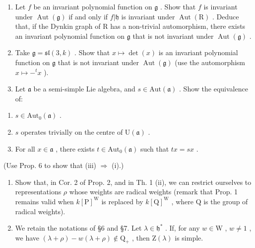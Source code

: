 
\begin{enumerate}
\def\labelenumi{\arabic{enumi})}
\item
  Let \(f\) be an invariant polynomial function on \(\mathfrak{g}\) . Show that \(f\) is invariant under \(\operatorname{Aut}(\mathfrak{g})\) if and only if \(f|\mathfrak{h}\) is invariant under \(\operatorname{Aut}(\mathrm{R})\) . Deduce that, if the Dynkin graph of \(\mathrm{R}\) has a non-trivial automorphism, there exists an invariant polynomial function on \(\mathfrak{g}\) that is not invariant under \(\operatorname{Aut}(\mathfrak{g})\) .
\item
  Take \(\mathfrak{g} = \mathfrak{sl}(3,k)\) . Show that \(x\mapsto \det (x)\) is an invariant polynomial function on \(\mathfrak{g}\) that is not invariant under \(\operatorname {Aut}(\mathfrak{g})\) (use the automorphism \(x\mapsto -^t x\) ).
\item
  Let \(\mathfrak{a}\) be a semi-simple Lie algebra, and \(s\in \mathrm{Aut}(\mathfrak{a})\) . Show the equivalence of:
\end{enumerate}

\begin{enumerate}
\def\labelenumi{(\roman{enumi})}
\item
  \(s \in \text{Aut}_{0}(\mathfrak{a})\) .
\item
  \(s\) operates trivially on the centre of \(\mathrm{U}(\mathfrak{a})\) .
\item
  For all \(x \in \mathfrak{a}\) , there exists \(t \in \mathrm{Aut}_0(\mathfrak{a})\) such that \(tx = sx\) .
\end{enumerate}

(Use Prop. 6 to show that (iii) \(\Longrightarrow\) (i).)

\begin{enumerate}
\def\labelenumi{\arabic{enumi})}
\setcounter{enumi}{3}
\item
  Show that, in Cor. 2 of Prop. 2, and in Th. 1 (ii), we can restrict ourselves to representations \(\rho\) whose weights are radical weights (remark that Prop. 1 remains valid when \(k[\mathrm{P}]^{\mathrm{W}}\) is replaced by \(k[\mathrm{Q}]^{\mathrm{W}}\) , where \(\mathrm{Q}\) is the group of radical weights).
\item
  We retain the notations of §6 and §7. Let \(\lambda \in \mathfrak{h}^*\) . If, for any \(w \in \mathrm{W}\) , \(w \neq 1\) , we have \((\lambda + \rho) - w(\lambda + \rho) \notin \mathrm{Q}_+\) , then \(\mathrm{Z}(\lambda)\) is simple.
\end{enumerate}

